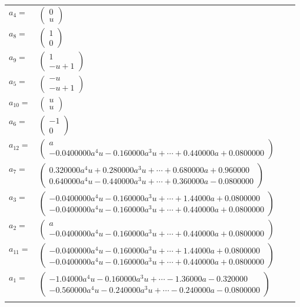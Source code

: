 \documentclass[1p]{elsarticle_modified}
\theoremstyle{definition}
\begin{document}
\begin{tabular}{m{7pt} m{180pt} m{7pt} m{180pt} }
\flushright $a_{4}=$&$\begin{pmatrix}0\\u\end{pmatrix}$ \\
\flushright $a_{8}=$&$\begin{pmatrix}1\\0\end{pmatrix}$ \\
\flushright $a_{9}=$&$\begin{pmatrix}1\\- u+1\end{pmatrix}$ \\
\flushright $a_{5}=$&$\begin{pmatrix}- u\\- u+1\end{pmatrix}$ \\
\flushright $a_{10}=$&$\begin{pmatrix}u\\u\end{pmatrix}$ \\
\flushright $a_{6}=$&$\begin{pmatrix}-1\\0\end{pmatrix}$ \\
\flushright $a_{12}=$&$\begin{pmatrix}a\\-0.0400000 a^{4} u-0.160000 a^{3} u+\cdots+0.440000 a+0.0800000\end{pmatrix}$ \\
\flushright $a_{7}=$&$\begin{pmatrix}0.320000 a^{4} u+0.280000 a^{3} u+\cdots+0.680000 a+0.960000\\0.640000 a^{4} u-0.440000 a^{3} u+\cdots+0.360000 a-0.0800000\end{pmatrix}$ \\
\flushright $a_{3}=$&$\begin{pmatrix}-0.0400000 a^{4} u-0.160000 a^{3} u+\cdots+1.44000 a+0.0800000\\-0.0400000 a^{4} u-0.160000 a^{3} u+\cdots+0.440000 a+0.0800000\end{pmatrix}$ \\
\flushright $a_{2}=$&$\begin{pmatrix}a\\-0.0400000 a^{4} u-0.160000 a^{3} u+\cdots+0.440000 a+0.0800000\end{pmatrix}$ \\
\flushright $a_{11}=$&$\begin{pmatrix}-0.0400000 a^{4} u-0.160000 a^{3} u+\cdots+1.44000 a+0.0800000\\-0.0400000 a^{4} u-0.160000 a^{3} u+\cdots+0.440000 a+0.0800000\end{pmatrix}$ \\
\flushright $a_{1}=$&$\begin{pmatrix}-1.04000 a^{4} u-0.160000 a^{3} u+\cdots-1.36000 a-0.320000\\-0.560000 a^{4} u-0.240000 a^{3} u+\cdots-0.240000 a-0.0800000\end{pmatrix}$\\&\end{tabular}
\end{document}
